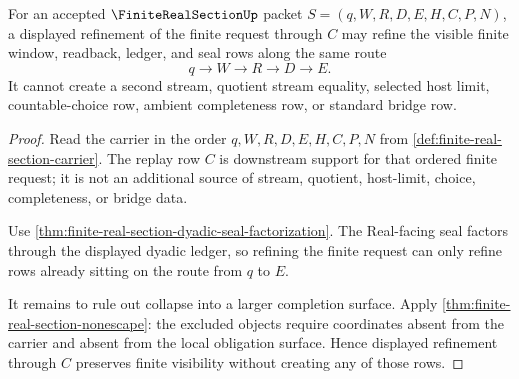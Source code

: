 \begin{theorem}
\label{thm:finite-real-section-refinement-noncollapse}
For an accepted $\FiniteRealSectionUp$ packet $S=(q,W,R,D,E,H,C,P,N)$, a displayed refinement of the finite request through $C$ may refine the visible finite window, readback, ledger, and seal rows along the same route
$$
q \to W \to R \to D \to E.
$$
It cannot create a second stream, quotient stream equality, selected host limit, countable-choice row, ambient completeness row, or standard bridge row.
\end{theorem}
\begin{proof}
Read the carrier in the order $q,W,R,D,E,H,C,P,N$ from \autoref{def:finite-real-section-carrier}. The replay row $C$ is downstream support for that ordered finite request; it is not an additional source of stream, quotient, host-limit, choice, completeness, or bridge data.

Use \autoref{thm:finite-real-section-dyadic-seal-factorization}. The Real-facing seal factors through the displayed dyadic ledger, so refining the finite request can only refine rows already sitting on the route from $q$ to $E$.

It remains to rule out collapse into a larger completion surface. Apply \autoref{thm:finite-real-section-nonescape}: the excluded objects require coordinates absent from the carrier and absent from the local obligation surface. Hence displayed refinement through $C$ preserves finite visibility without creating any of those rows.
\end{proof}

